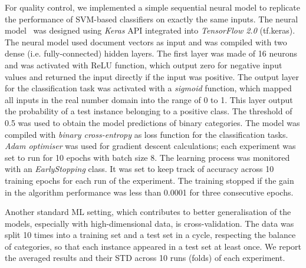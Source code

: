 For quality control, we implemented a simple sequential neural model to replicate the performance of SVM-based classifiers on exactly the same inputs. The neural model~\label{pg:neural} was designed using \textit{Keras} \gls{API} integrated into \textit{TensorFlow 2.0} (tf.keras). The neural model used document vectors as input and was compiled with two dense (i.e. fully-connected) hidden layers. The first layer was  made of 16 neurons and was activated with \gls{ReLU} function, which output zero for negative input values and returned the input directly if the input was positive. The output layer for the classification task was activated with a \textit{sigmoid} function, which mapped all inputs in the real number domain into the range of 0 to 1. %
This layer output the probability of a test instance belonging to a positive class. The threshold of 0.5 was used to obtain the model predictions of binary categories. 
The model was compiled with \textit{binary cross-entropy} as loss function for the classification tasks. \textit{Adam optimiser} was used for gradient descent calculations; each experiment was set to run for 10 epochs with batch size 8. The learning process was monitored with an \textit{EarlyStopping} class. It was set to keep track of accuracy across 10 training epochs for each run of the experiment. The training stopped if the gain in the algorithm performance was less than 0.0001 for three consecutive epochs. 

Another standard ML setting, which contributes to better generalisation of the models, especially with high-dimensional data, is cross-validation. 
The data was split 10 times into a training set and a test set in a cycle, respecting the balance of categories, so that each instance appeared in a test set at least once. We report the averaged results and their \gls{STD} across 10 runs (folds) of each experiment. 


